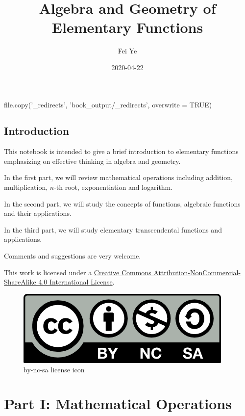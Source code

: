 \documentclass[
  en,11pt]{elegantbook}
\institute{QCC-CUNY}
\title{Algebra and Geometry of Elementary Functions}
\author{Fei Ye}
\date{2020-04-22}
\renewcommand{\baselinestretch}{1.1}
\renewcommand{\baselinestretch}{0.975}
\begin{document}
\maketitle

{
\setcounter{tocdepth}{0}
\tableofcontents
}
file.copy('\_redirects', 'book\_output/\_redirects', overwrite = TRUE)

\mainmatter

\hypersetup{pageanchor=true}

\renewcommand{\baselinestretch}{1.05}\normalsize

\captionsetup[figure]{labelformat=empty}
\captionsetup[subfigure]{labelformat=empty}

\hypertarget{introduction}{%
\chapter*{Introduction}\label{introduction}}

This notebook is intended to give a brief introduction to elementary functions emphasizing on effective thinking in algebra and geometry.

In the first part, we will review mathematical operations including addition, multiplication, \(n\)-th root, exponentiation and logarithm.

In the second part, we will study the concepts of functions, algebraic functions and their applications.

In the third part, we will study elementary transcendental functions and applications.

Comments and suggestions are very welcome.

This work is licensed under a \href{https://creativecommons.org/licenses/by-nc-sa/4.0/}{Creative Commons Attribution-NonCommercial-ShareAlike 4.0 International License}.

\begin{figure}
\centering
\includegraphics{figs/by-nc-sa.png}
\caption{by-nc-sa license icon}
\end{figure}

\hypertarget{part-part-i-mathematical-operations}{%
\part*{Part I: Mathematical Operations}\label{part-part-i-mathematical-operations}}
\end{document}

